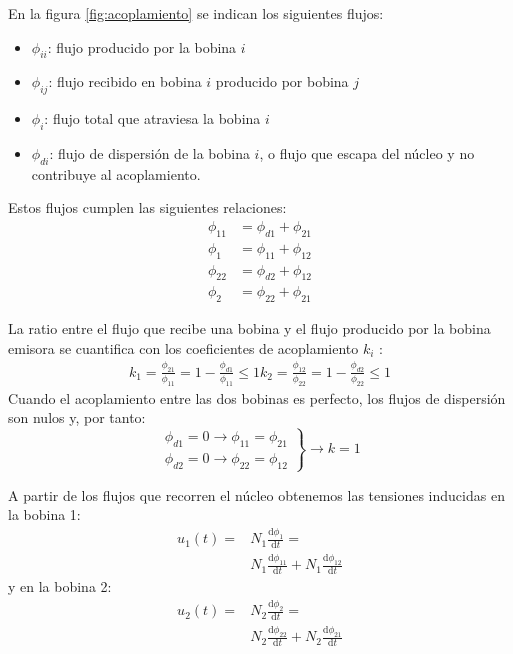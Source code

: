 En la figura \ref{fig:acoplamiento} se indican los siguientes flujos:
\begin{itemize}
\item   $\phi_{ii}$: flujo producido por la bobina $i$
\item   $\phi_{ij}$: flujo recibido en bobina $i$ producido por bobina $j$
\item   $\phi_{i}$: flujo total que atraviesa la bobina $i$
\item   $\phi_{di}$: flujo de dispersión de la bobina $i$, o flujo que escapa del núcleo y no contribuye al acoplamiento.
\end{itemize}

Estos flujos cumplen las siguientes relaciones:
\begin{align*}
  \phi_{11} &= \phi_{d1} + \phi_{21}\\
  \phi_{1} &= \phi_{11} + \phi_{12}\\
  \phi_{22} &= \phi_{d2} + \phi_{12}\\
  \phi_{2} &= \phi_{22} + \phi_{21}
\end{align*}

La ratio entre el flujo que recibe una bobina y el flujo producido por la bobina emisora se cuantifica con los coeficientes de acoplamiento $k_i$ :
\begin{align}
  \label{eq:coefs-acoplamiento}
  k_1 = \frac{\phi_{21}}{\phi_{11}} = 1 - \frac{\phi_{d1}}{\phi_{11}} \leq 1
  k_2 = \frac{\phi_{12}}{\phi_{22}} = 1 - \frac{\phi_{d2}}{\phi_{22}} \leq 1
\end{align}
Cuando el acoplamiento entre las dos bobinas es perfecto, los flujos de dispersión son nulos y, por tanto:
\[\left.
\begin{array}{cc}
  \phi_{d1} = 0 \rightarrow   \phi_{11} = \phi_{21}\\
  \phi_{d2} = 0 \rightarrow \phi_{22} = \phi_{12} 
  \end{array} \right\} \rightarrow k = 1
\]

A partir de los flujos que recorren el núcleo obtenemos las tensiones inducidas en la bobina 1:
\begin{align*}
  u_1(t) = &N_1 \frac{\mathrm{d}\phi_1}{\mathrm{d}t} = \\
  &N_1 \frac{\mathrm{d}\phi_{11}}{\mathrm{d}t} + N_1 \frac{\mathrm{d}\phi_{12}}{\mathrm{d}t}
\end{align*}
y en la bobina 2:
\begin{align*}
  u_2(t) = &N_2 \frac{\mathrm{d}\phi_2}{\mathrm{d}t} = \\
  &N_2 \frac{\mathrm{d}\phi_{22}}{\mathrm{d}t} + N_2 \frac{\mathrm{d}\phi_{21}}{\mathrm{d}t}
\end{align*}

